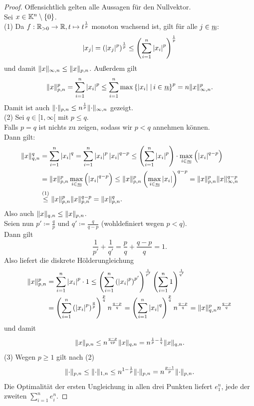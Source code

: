 \begin{proof}
Offensichtlich gelten alle Aussagen für den Nullvektor.\\
Sei $x \in \mathbb{K}^n\setminus\left\{0\right\}$.\\
(1)
Da $f: \mathbb{R}_{>0} \rightarrow \mathbb{R}, t \mapsto t^{\frac 1 p}$ monoton wachsend
ist, gilt für alle $j \in \haken n$:
\[\left|x_j\right| = \left(\left|x_j\right|^p \right)^{\frac 1p}
\le \left(\sum_{i=1}^n \left|x_i\right|^p\right)^{\frac 1 p}\]
und damit $\lVert x\rVert _{\infty, n} \le \lVert x\rVert _{p,n}$.
Außerdem gilt\[
\norm x _{p, n}^p = \sum_{i=1}^n \abs{x_i}^p \le 
\sum_{i=1}^n \max\menge{\abs{x_i}}{i\in\haken n}^p=n \norm x _{\infty, n}^p
\text.\]
Damit ist auch $\lVert\cdot\rVert_{p, n} \le n^{\frac 1 p}\lVert\cdot\rVert_{\infty, n}$
gezeigt.\\
(2) Sei $q \in [1, \infty[$ mit $p \le q$.\\
Falls $p=q$ ist nichts zu zeigen, sodass wir $p < q$ annehmen können.\\
Dann gilt:
\begin{align*}
\norm x _{q,n}^q&= \sum_{i=1}^n \abs{x_i}^q
=\sum_{i=1}^n \abs{x_i}^p\abs{x_i}^{q-p}
\le \left(\sum_{i=1}^n \abs{x_i}^p \right)\cdot 
  \max_{i \in \haken n}\left(\abs{x_i}^{q-p}\right)\\
 &= \norm x_{p,n}^p \max_{i \in \haken n}\left(\abs{x_i}^{q-p}\right)
 \le \norm x_{p,n}^p \left(\max_{i \in \haken n}\abs{x_i}\right)^{q-p}
 = \norm x _{p, n}^p \norm x _{\infty, n}^{q-p}\\
 &\overset{(1)}\le \norm x _{p, n}^p \norm x _{p, n}^{q-p} = \norm x _{p,n}^q
 \text.\end{align*}
Also auch $\lVert x\rVert _{q, n} \le \lVert x\rVert _{p, n}$.\\
Seien nun $p'\coloneqq\frac qp$ und $q'\coloneqq  \frac q{q-p}$ (wohldefiniert wegen $p<q$).\\
Dann gilt
\[\frac 1 {p'} + \frac 1 {q'} = \frac p q + \frac{q-p}q = 1\text{.}\]
Also liefert die diskrete Hölderungleichung
\begin{align*}
\lVert x\rVert _{p,n}^p &= \sum_{i=1}^n \left|x_i\right|^p \cdot 1 \le
\left(\sum_{i=1}^n \left(\left|x_i\right|^p\right)^{p'} \right)^{\frac 1 {p'}}
\left(\sum_{i=1}^n 1 \right)^{\frac 1 {q'}}\\
&= \left(\sum_{i=1}^n  \left(\left|x_i\right|^p\right)^{\frac q p}\right)^{\frac pq}
 n^{\frac {q-p}q}
 = \left(\sum_{i=1}^n \left|x_i\right|^q \right)^{\frac p q} n^{\frac {q-p}q}
 = \lVert x\rVert _{q, n}^p n ^{\frac {q-p}q}
\end{align*}
und damit
\[\lVert x\rVert_{p, n} \le n ^\frac{q-p}{qp} \lVert x\rVert _{q, n} 
= n ^{\frac 1 p - \frac 1 q}\lVert x\rVert _{q, n}\text.\]
(3) Wegen $p \ge 1$ gilt nach (2)
\[\lVert\cdot\rVert_{p,n} \le \lVert\cdot\rVert_{1, n} 
\le n^{1 - \frac 1 p}\lVert\cdot\rVert_{p,n}
= n ^{\frac {p-1}p}\lVert\cdot\rVert_{p,n}\text.\]
Die Optimalität der ersten Ungleichung in allen drei Punkten liefert $e_1^n$,
jede der zweiten $\sum_{i=1}^n e_i^n$.
\end{proof}